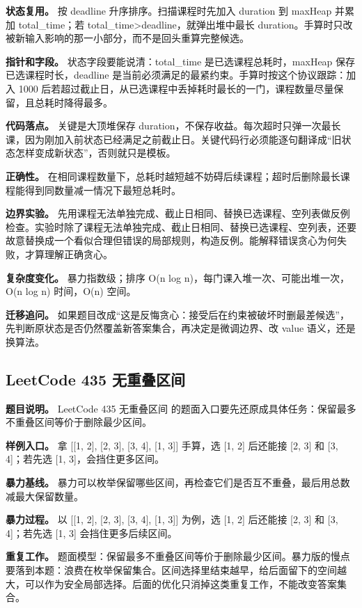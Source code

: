 \textbf{状态复用。} 按 deadline 升序排序。扫描课程时先加入 duration 到 maxHeap 并累加 total\_time；若 total\_time>deadline，就弹出堆中最长 duration。手算时只改被新输入影响的那一小部分，而不是回头重算完整候选。

\textbf{指针和字段。} 状态字段要能说清：total\_time 是已选课程总耗时，maxHeap 保存已选课程时长，deadline 是当前必须满足的最紧约束。手算时按这个协议跟踪：加入 1000 后若超过截止日，从已选课程中丢掉耗时最长的一门，课程数量尽量保留，且总耗时降得最多。

\textbf{代码落点。} 关键是大顶堆保存 duration，不保存收益。每次超时只弹一次最长课，因为刚加入前状态已经满足之前截止日。关键代码行必须能逐句翻译成“旧状态怎样变成新状态”，否则就只是模板。

\textbf{正确性。} 在相同课程数量下，总耗时越短越不妨碍后续课程；超时后删除最长课程能得到同数量减一情况下最短总耗时。

\textbf{边界实验。} 先用课程无法单独完成、截止日相同、替换已选课程、空列表做反例检查。实验时除了课程无法单独完成、截止日相同、替换已选课程、空列表，还要故意替换成一个看似合理但错误的局部规则，构造反例。能解释错误贪心为何失败，才算理解正确贪心。

\textbf{复杂度变化。} 暴力指数级；排序 O(n log n)，每门课入堆一次、可能出堆一次，O(n log n) 时间，O(n) 空间。

\textbf{迁移追问。} 如果题目改成“这是反悔贪心：接受后在约束被破坏时删最差候选”，先判断原状态是否仍然覆盖新答案集合，再决定是微调边界、改 value 语义，还是换算法。

\subsection{LeetCode 435 无重叠区间}

\textbf{题目说明。} LeetCode 435 无重叠区间 的题面入口要先还原成具体任务：保留最多不重叠区间等价于删除最少区间。

\textbf{样例入口。} 拿 [[1, 2], [2, 3], [3, 4], [1, 3]] 手算，选 [1, 2] 后还能接 [2, 3] 和 [3, 4]；若先选 [1, 3]，会挡住更多区间。

\textbf{暴力基线。} 暴力可以枚举保留哪些区间，再检查它们是否互不重叠，最后用总数减最大保留数量。

\textbf{暴力过程。} 以 [[1, 2], [2, 3], [3, 4], [1, 3]] 为例，选 [1, 2] 后还能接 [2, 3] 和 [3, 4]；若先选 [1, 3] 会挡住更多后续区间。

\textbf{重复工作。} 题面模型：保留最多不重叠区间等价于删除最少区间。暴力版的慢点要落到本题：浪费在枚举保留集合。区间选择里结束越早，给后面留下的空间越大，可以作为安全局部选择。后面的优化只消掉这类重复工作，不能改变答案集合。

